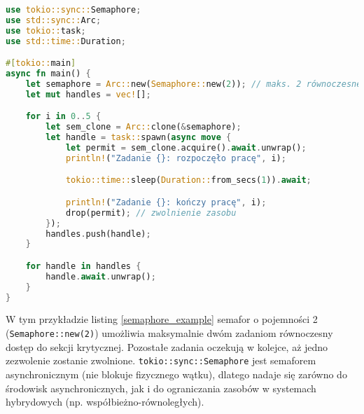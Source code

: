 \begin{lstlisting}[language=Rust, caption=Przykład użycia semafora, label=semaphore_example]
use tokio::sync::Semaphore;
use std::sync::Arc;
use tokio::task;
use std::time::Duration;

#[tokio::main]
async fn main() {
    let semaphore = Arc::new(Semaphore::new(2)); // maks. 2 równoczesne zasoby
    let mut handles = vec![];

    for i in 0..5 {
        let sem_clone = Arc::clone(&semaphore);
        let handle = task::spawn(async move {
            let permit = sem_clone.acquire().await.unwrap();
            println!("Zadanie {}: rozpoczęło pracę", i);

            tokio::time::sleep(Duration::from_secs(1)).await;

            println!("Zadanie {}: kończy pracę", i);
            drop(permit); // zwolnienie zasobu
        });
        handles.push(handle);
    }

    for handle in handles {
        handle.await.unwrap();
    }
}
\end{lstlisting}
W tym przykładzie listing \ref{semaphore_example} semafor o pojemności 2 (\texttt{Semaphore::new(2)}) umożliwia maksymalnie dwóm zadaniom równoczesny dostęp do sekcji krytycznej. Pozostałe zadania oczekują w kolejce, aż jedno zezwolenie zostanie zwolnione. \texttt{tokio::sync::Semaphore} jest semaforem asynchronicznym (nie blokuje fizycznego wątku), dlatego nadaje się zarówno do środowisk asynchronicznych, jak i do ograniczania zasobów w systemach hybrydowych (np. współbieżno-równoległych).